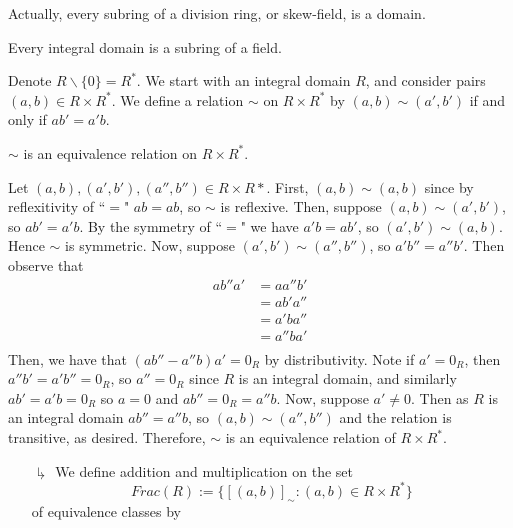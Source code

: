 \documentclass[12pt, a4paper, twoside, openright, titlepage]{book}
\begin{document}
\begin{rmk}{}{}
    Actually, every subring of a division ring, or skew-field, is a domain.
\end{rmk}

\begin{thm}{}{}
    Every integral domain is a subring of a field.
\end{thm}

\begin{cons}{}{}
    Denote $R\backslash\{0\} = R^*$. We start with an integral domain $R$, and consider pairs $(a,b) \in R\times R^*$. We define a relation $\sim$ on $R\times R^*$ by $(a,b) \sim (a',b')$ if and only if $ab' = a'b$.
    \begin{claim}{}{}
        $\sim$ is an equivalence relation on $R\times R^*$.
    \end{claim}
    \begin{proof*}{}{}
        Let $(a,b),(a',b'), (a'',b'') \in R\times R*$. First, $(a,b)\sim (a,b)$ since by reflexitivity of ``$=$" $ab = ab$, so $\sim$ is reflexive. Then, suppose $(a,b)\sim (a',b')$, so $ab' = a'b$. By the symmetry of ``$=$" we have $a'b = ab'$, so $(a',b') \sim (a,b)$. Hence $\sim$ is symmetric. Now, suppose $(a',b') \sim (a'',b'')$, so $a'b'' = a''b'$. Then observe that \begin{align*}
            ab''a' &= aa''b'\\
            &= ab'a'' \tag{commutivity}\\
            &= a'ba'' \\
            &= a''ba' \tag{commutivity} \\
        \end{align*}
        Then, we have that $(ab'' - a''b)a' = 0_R$ by distributivity. Note if $a' = 0_R$, then $a''b' = a'b'' = 0_R$, so $a'' = 0_R$ since $R$ is an integral domain, and similarly $ab' = a'b = 0_R$ so $a=0$ and $ab'' = 0_R = a''b$. Now, suppose $a' \neq 0$. Then as $R$ is an integral domain $ab'' = a''b$, so $(a,b) \sim (a'',b'')$ and the relation is transitive, as desired. Therefore, $\sim$ is an equivalence relation of $R\times R^*$.
    \end{proof*}
    \begin{enumerate}
        \item[$\drsh$] We define addition and multiplication on the set \begin{equation}
            Frac(R) := \{[(a,b)]_{\sim}:(a,b) \in R\times R^*\}
        \end{equation}
        of equivalence classes by \begin{equation}

\end{equation}
\end{enumerate}
\end{cons}
\end{document}
